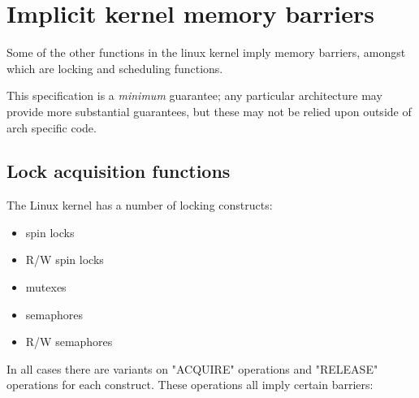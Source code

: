 \section{Implicit kernel memory barriers}

Some of the other functions in the linux kernel imply memory barriers, amongst
which are locking and scheduling functions.

This specification is a \emph{minimum} guarantee; any particular architecture
may provide more substantial guarantees, but these may not be relied upon
outside of arch specific code.


\subsection{Lock acquisition functions}

The Linux kernel has a number of locking constructs:

\begin{itemize}
 \item spin locks
 \item R/W spin locks
 \item mutexes
 \item semaphores
 \item R/W semaphores
\end{itemize}

In all cases there are variants on "ACQUIRE" operations and "RELEASE" operations
for each construct.
These operations all imply certain barriers:

